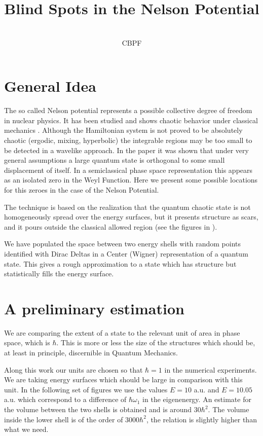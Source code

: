 \documentclass[a4paper,12pt]{article}
\title{Blind Spots in the Nelson Potential}
\author{\\CBPF}
\begin{document}
\maketitle

\begin{abstract}

\end{abstract}

\section{General Idea}

The so called Nelson potential represents a possible collective
degree of freedom in nuclear physics. It has been studied and shows
chaotic behavior under classical mechanics \cite{Barang87}. 
Although the Hamiltonian system is not proved to be absolutely
chaotic (ergodic, mixing, hyperbolic) 
the integrable regions may be too
small to be detected in a wavelike approach. In the paper 
\cite{Zambrano09} it was shown that  under very 
general assumptions a large quantum state is orthogonal to some
small displacement of itself. In a semiclassical phase space
representation this appears as an isolated zero in the
Weyl Function. Here we present some possible locations for  this zeroes
in the case of the Nelson Potential. 

The technique is based on the realization that the
quantum chaotic state is not homogeneously spread over
the energy surfaces, but it presents structure as
scars, and it pours outside the classical
allowed region (see the figures in \cite{Barang93}).

We have populated the space between two 
energy shells with random points identified with
Dirac Deltas in a Center (Wigner) representation of
a quantum state. This gives a rough approximation
to a state which has structure but statistically 
fills the energy surface. 

\section{A preliminary estimation}

We are comparing the extent of a state to the relevant
unit of area in phase space, which is $\hbar$. This is 
more or less the size of the structures which should be,
at least in principle, discernible in Quantum Mechanics.

Along this
work our units are chosen so that $\hbar=1$ in the numerical
experiments.
We are taking energy surfaces which should be large
in comparison with this unit. In the following
set of figures we use the values $E=10$ a.u. and
$E=10.05$ a.u. which correspond to a difference of
$\hbar \omega_1$ in the eigenenergy.
An estimate for the volume between the two shells
is obtained and is around $30 \hbar^2$. The volume
inside the lower shell is of the order of $3000 \hbar^2$,
the relation is slightly higher than what we need.
\end{document}
